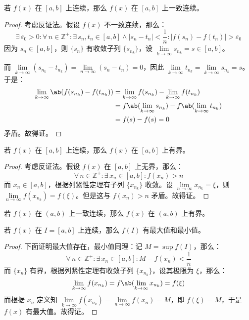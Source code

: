\begin{theorem}[Cantor 定理]
	若 $f(x)$ 在 $[a, b]$ 上连续，那么 $f(x)$ 在 $[a, b]$ 上一致连续。

	\begin{proof}
		考虑反证法。假设 $f(x)$ 不一致连续，那么：
		$$
		\exists\,\varepsilon_0 > 0: \forall\,n \in \mathbb{Z}^+: \exists\,s_n, t_n \in [a, b] \land |s_n - t_n| < \frac{1}{n}: |f(s_n) - f(t_n)| > \varepsilon_0
		$$
		因为 $s_n \in [a, b]$，则 $\{s_n\}$ 有收敛子列 $\{s_{n_k}\}$，设 $\lim\limits_{k \to \infty} s_{n_k} = s \in [a, b]$。

		而 $\lim\limits_{k \to \infty} (s_{n_k} - t_{n_k}) = \lim\limits_{n \to \infty} (s_n - t_n) = 0$，因此 $\lim\limits_{k \to \infty} t_{n_k} = \lim\limits_{k \to \infty} s_{n_k} = s$。于是：
		$$
		\begin{aligned}
			\lim_{k \to \infty} \ab(f(s_{n_k}) - f(t_{n_k})) & = \lim_{k \to \infty} f(s_{n_k}) - \lim_{k \to \infty} f(t_{n_k}) \\
			& = f\ab(\lim_{k \to \infty} s_{n_k}) - f\ab(\lim_{k \to \infty} t_{n_k}) \\
			& = f(s) - f(s) = 0
		\end{aligned}
		$$
		矛盾。故得证。
	\end{proof}
\end{theorem}

\begin{theorem}[有界性定理]
	若 $f(x)$ 在 $[a, b]$ 上连续，那么 $f(x)$ 在 $[a, b]$ 上有界。

	\begin{proof}
		考虑反证法。假设 $f(x)$ 在 $[a, b]$ 上无界，那么：
		$$
		\forall\,n \in \mathbb{Z}^+: \exists\,x_n \in [a, b]: f(x_n) > n
		$$
		而 $x_n \in [a, b]$，根据列紧性定理有子列 $\{x_{n_k}\}$ 收敛。设 $\lim\limits_{n \to \infty} x_{n_k} = \xi$，则 $\lim\limits_{n \to \infty} f(x_{n_k}) = f(\xi)$。但是这与 $f(x_n) > n$ 矛盾。故得证。
	\end{proof}
\end{theorem}

\begin{corollary}
	若 $f(x)$ 在 $(a, b)$ 上一致连续，那么 $f(x)$ 在 $(a, b)$ 上有界。
\end{corollary}

\begin{theorem}[最值定理]
	若 $f(x)$ 在 $I = [a, b]$ 上连续，那么 $f(I)$ 有最大值和最小值。

	\begin{proof}
		下面证明最大值存在，最小值同理：记 $M = \sup f(I)$，那么：
		$$
		\forall\,n \in \mathbb{Z}^+: \exists\,x_n \in [a, b]: M - f(x_n) < \frac{1}{n}
		$$
		而 $\{x_n\}$ 有界，根据列紧性定理有收敛子列 $\{x_{n_k}\}$，设其极限为 $\xi$，那么：
		$$
		\lim_{k \to \infty} f(x_{n_k}) = f\ab(\lim_{k \to \infty} x_{n_k}) = f(\xi)
		$$
		而根据 $x_n$ 定义知 $\lim\limits_{k \to \infty} f(x_{n_k}) = \lim\limits_{n \to \infty} f(x_n) = M$，即 $f(\xi) = M$，于是 $f(x)$ 有最大值。故得证。
	\end{proof}
\end{theorem}


